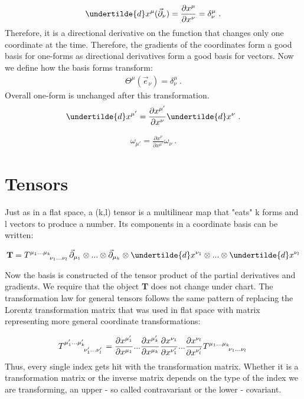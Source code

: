 \documentclass[11pt]{article}
\begin{document}
\begin{align}
\undertilde{d}x^\mu (\vec{\partial}_\nu) = \frac{\partial x^\mu}{\partial x^\nu} = \delta_\nu^\mu \ .
\end{align}
Therefore, it is a directional derivative on the function that changes only one coordinate at the time. Therefore, the gradients of the coordinates form a good basis for one-forms as directional derivatives form a good basis for vectors.
Now we define how the basis forms transform:
\begin{align}
\Theta^\mu (\vec{e}_\nu) = \delta_\nu^\mu \ .
\end{align}
Overall one-form is unchanged after this transformation. 
\begin{align}
\undertilde{d}x^{\mu'} = \frac{\partial x^{\mu'}}{\partial x^\nu}\undertilde{d}x^{\nu} \ .
\end{align}

\begin{align}
\omega_{\mu'} = \frac{\partial x^{\nu}}{\partial x^{\mu'}}\omega_\nu \ .
\end{align}





\section{Tensors}

Just as in a flat space, a (k,l) tensor is a multilinear map that "eats" k forms and l vectors to produce a number. Its components in a coordinate basis can be written:

\begin{align}
\textbf{T} = \tensor{T}{^{\mu_1...\mu_k}_{\nu_1 ... \nu_l}}\vec{\partial}_{\mu_1}\otimes ... \otimes \vec{\partial}_{\mu_k}\otimes \undertilde{d}x^{\nu_1}\otimes ... \otimes \undertilde{d}x^{\nu_l}
\end{align}

Now the basis is constructed of the tensor product of the partial derivatives and gradients.
We require that the object \textbf{T} does not change under chart. The transformation law for general tensors follows the same pattern of replacing the Lorentz transformation matrix that was used in flat space with matrix representing more general coordinate transformations:

\begin{align}
\tensor{T}{^{\mu'_1...\mu'_k}_{\nu'_1 ... \nu'_l}} = \frac{\partial x^{\mu'_1}}{\partial x^{\mu_1}}...\frac{\partial x^{\mu'_k}}{\partial x^{\mu_k}}\frac{\partial x^{\nu_1}}{\partial x^{\nu'_1}}... \frac{\partial x^{\nu_l}}{\partial x^{\nu'_l}}  \tensor{T}{^{\mu_1...\mu_k}_{\nu_1 ... \nu_l}}
\end{align}
Thus, every single index gets hit with the transformation matrix. Whether it is a transformation matrix or the inverse matrix depends on the type of the index we are transforming, an upper - so called contravariant or the lower - covariant.
\end{document}
